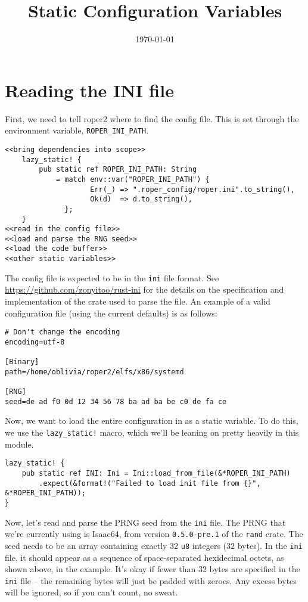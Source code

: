 \documentclass[11pt]{article}
\date{\today}
\title{Static Configuration Variables}
\begin{document}
\maketitle
\tableofcontents


\section{Reading the INI file}
\label{sec:org613a51d}

First, we need to tell \gls{roper2} where to find the config file. This is
set through the environment variable, \texttt{ROPER\_INI\_PATH}.
\lstset{language=rust,label= ,caption= ,captionpos=b,numbers=none}
\begin{lstlisting}
<<bring dependencies into scope>>
    lazy_static! {
        pub static ref ROPER_INI_PATH: String
            = match env::var("ROPER_INI_PATH") {
                    Err(_) => ".roper_config/roper.ini".to_string(),
                    Ok(d)  => d.to_string(),
              };
    }
<<read in the config file>>
<<load and parse the RNG seed>>
<<load the code buffer>>
<<other static variables>>
\end{lstlisting}

The config file is expected to be in the \texttt{ini} file format. See 
\url{https://github.com/zonyitoo/rust-ini} for the details on the specification
and implementation of the crate used to parse the file. An example of a 
valid configuration file (using the current defaults) is as follows:

\begin{verbatim}
# Don't change the encoding
encoding=utf-8

[Binary]
path=/home/oblivia/roper2/elfs/x86/systemd

[RNG]
seed=de ad f0 0d 12 34 56 78 ba ad ba be c0 de fa ce
\end{verbatim}

Now, we want to load the entire configuration in as a static variable.
To do this, we use the \texttt{lazy\_static!} macro, which we'll be leaning on
pretty heavily in this module. 

\lstset{language=rust,label=orgd5ab441,caption= ,captionpos=b,numbers=none}
\begin{lstlisting}
lazy_static! {
    pub static ref INI: Ini = Ini::load_from_file(&*ROPER_INI_PATH)
        .expect(&format!("Failed to load init file from {}", &*ROPER_INI_PATH));
}
\end{lstlisting}

Now, let's read and parse the PRNG seed from the \texttt{ini} file. The PRNG
that we're currently using is Isaac64, from version \texttt{0.5.0-pre.1} of
the \texttt{rand} crate. The seed needs to be an array containing exactly 32 \texttt{u8}
integers (32 bytes). In the \texttt{ini} file, it should appear as a sequence of
space-separated hexidecimal octets, as shown above, in the example. It's
okay if fewer than 32 bytes are specified in the \texttt{ini} file -- the remaining
bytes will just be padded with zeroes. Any excess bytes will be ignored,
so if you can't count, no sweat.
\end{document}

